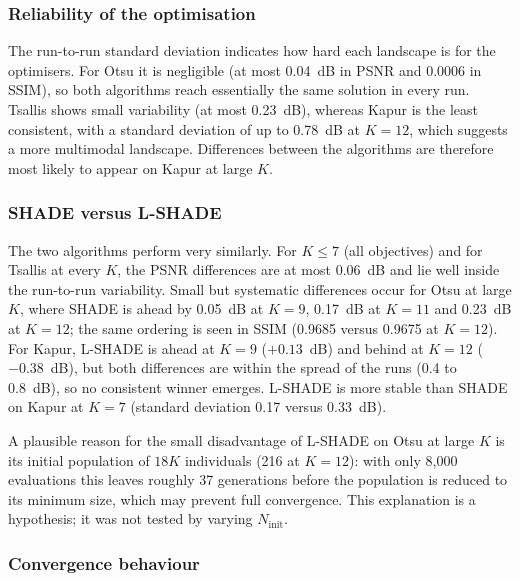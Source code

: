 \documentclass[review]{elsarticle}
\begin{document}
\subsubsection{Reliability of the optimisation}

The run-to-run standard deviation indicates how hard each landscape is for
the optimisers. For Otsu it is negligible (at most 0.04~dB in PSNR and 0.0006
in SSIM), so both algorithms reach essentially the same solution in every run.
Tsallis shows small variability (at most 0.23~dB), whereas Kapur is the least
consistent, with a standard deviation of up to 0.78~dB at $K=12$, which
suggests a more multimodal landscape. Differences between the algorithms are
therefore most likely to appear on Kapur at large $K$.

\subsubsection{SHADE versus L-SHADE}

The two algorithms perform very similarly. For $K\leq 7$ (all objectives) and
for Tsallis at every $K$, the PSNR differences are at most 0.06~dB and lie
well inside the run-to-run variability. Small but systematic differences occur
for Otsu at large $K$, where SHADE is ahead by 0.05~dB at $K=9$, 0.17~dB at
$K=11$ and 0.23~dB at $K=12$; the same ordering is seen in SSIM (0.9685
versus 0.9675 at $K=12$). For Kapur, L-SHADE is ahead at $K=9$ ($+0.13$~dB) and
behind at $K=12$ ($-0.38$~dB), but both differences are within the spread of
the runs (0.4 to 0.8~dB), so no consistent winner emerges. L-SHADE is more
stable than SHADE on Kapur at $K=7$ (standard deviation 0.17 versus 0.33~dB).

A plausible reason for the small disadvantage of L-SHADE on Otsu at large $K$
is its initial population of $18K$ individuals (216 at $K=12$): with only
8{,}000 evaluations this leaves roughly 37 generations before the population
is reduced to its minimum size, which may prevent full convergence. This
explanation is a hypothesis; it was not tested by varying $N_{\text{init}}$.

\subsubsection{Convergence behaviour}
\end{document}
